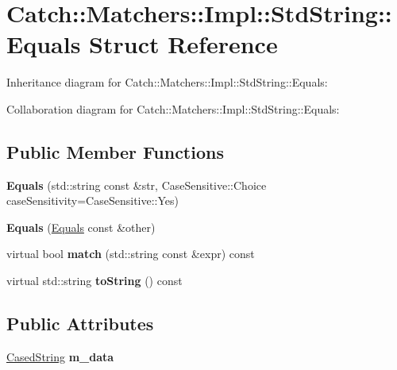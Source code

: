 \hypertarget{struct_catch_1_1_matchers_1_1_impl_1_1_std_string_1_1_equals}{}\section{Catch\+:\+:Matchers\+:\+:Impl\+:\+:Std\+String\+:\+:Equals Struct Reference}
\label{struct_catch_1_1_matchers_1_1_impl_1_1_std_string_1_1_equals}


Inheritance diagram for Catch\+:\+:Matchers\+:\+:Impl\+:\+:Std\+String\+:\+:Equals\+:


Collaboration diagram for Catch\+:\+:Matchers\+:\+:Impl\+:\+:Std\+String\+:\+:Equals\+:
\subsection*{Public Member Functions}
\begin{DoxyCompactItemize}
\item 
\mbox{\label{struct_catch_1_1_matchers_1_1_impl_1_1_std_string_1_1_equals_a5921d5ed75320fb64a678e3f1292a464}} 
{\bfseries Equals} (std\+::string const \&str, Case\+Sensitive\+::\+Choice case\+Sensitivity=Case\+Sensitive\+::\+Yes)
\item 
\mbox{\label{struct_catch_1_1_matchers_1_1_impl_1_1_std_string_1_1_equals_acaa97de06aedf363ae803d65a975f5e4}} 
{\bfseries Equals} (\hyperlink{struct_catch_1_1_matchers_1_1_impl_1_1_std_string_1_1_equals}{Equals} const \&other)
\item 
\mbox{\label{struct_catch_1_1_matchers_1_1_impl_1_1_std_string_1_1_equals_abf0a94b4e66dbd586268d9983f867e68}} 
virtual bool {\bfseries match} (std\+::string const \&expr) const
\item 
\mbox{\label{struct_catch_1_1_matchers_1_1_impl_1_1_std_string_1_1_equals_ab0d73961b95d9836d77b9e2e94c3790b}} 
virtual std\+::string {\bfseries to\+String} () const
\end{DoxyCompactItemize}
\subsection*{Public Attributes}
\begin{DoxyCompactItemize}
\item 
\mbox{\label{struct_catch_1_1_matchers_1_1_impl_1_1_std_string_1_1_equals_ae09964b7ba291ce574b514a2ee3eddb0}} 
\hyperlink{struct_catch_1_1_matchers_1_1_impl_1_1_std_string_1_1_cased_string}{Cased\+String} {\bfseries m\+\_\+data}
\end{DoxyCompactItemize}
